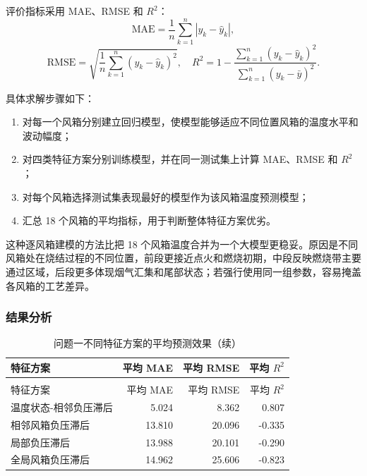 \documentclass[UTF8,a4paper,zihao=-4]{ctexart}
\begin{document}
评价指标采用 MAE、RMSE 和 $R^2$：
\begin{equation}
\mathrm{MAE}=\frac{1}{n}\sum_{k=1}^{n}|y_k-\hat y_k|,
\end{equation}
\begin{equation}
\mathrm{RMSE}=\sqrt{\frac{1}{n}\sum_{k=1}^{n}(y_k-\hat y_k)^2},\quad
R^2=1-\frac{\sum_{k=1}^{n}(y_k-\hat y_k)^2}{\sum_{k=1}^{n}(y_k-\bar y)^2}.
\end{equation}

具体求解步骤如下：

\begin{enumerate}
  \item 对每一个风箱分别建立回归模型，使模型能够适应不同位置风箱的温度水平和波动幅度；
  \item 对四类特征方案分别训练模型，并在同一测试集上计算 MAE、RMSE 和 $R^2$；
  \item 对每个风箱选择测试集表现最好的模型作为该风箱温度预测模型；
  \item 汇总 18 个风箱的平均指标，用于判断整体特征方案优劣。
\end{enumerate}

这种逐风箱建模的方法比把 18 个风箱温度合并为一个大模型更稳妥。原因是不同风箱处在烧结过程的不同位置，前段更接近点火和燃烧初期，中段反映燃烧带主要通过区域，后段更多体现烟气汇集和尾部状态；若强行使用同一组参数，容易掩盖各风箱的工艺差异。

\subsubsection{结果分析}

\begin{longtable}{l r r r}
\caption{问题一不同特征方案的平均预测效果}\\
\toprule
特征方案 & 平均 MAE & 平均 RMSE & 平均 $R^2$ \\
\midrule
\endfirsthead
\caption[]{问题一不同特征方案的平均预测效果（续）}\\
\toprule
特征方案 & 平均 MAE & 平均 RMSE & 平均 $R^2$ \\
\midrule
\endhead
\bottomrule
\endfoot
温度状态-相邻负压滞后 & 5.024 & 8.362 & 0.807 \\
相邻风箱负压滞后 & 13.810 & 20.096 & -0.335 \\
局部负压滞后 & 13.988 & 20.101 & -0.290 \\
全局风箱负压滞后 & 14.962 & 25.606 & -0.823 \\
\end{longtable}
\end{document}

